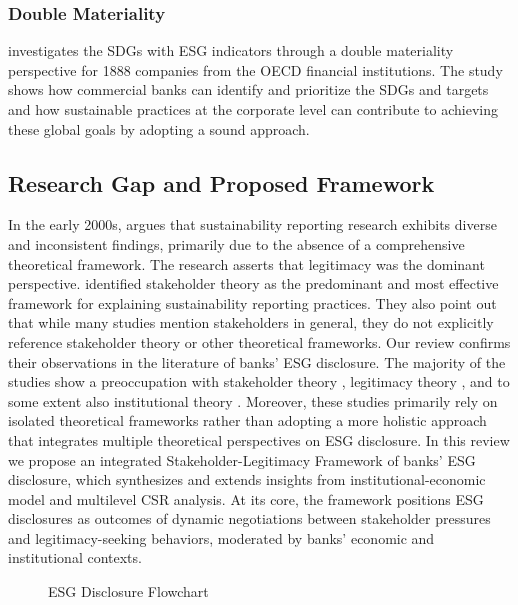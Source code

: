 \documentclass[
  authoryear]{elsarticle}
\makeatletter
\newcommand*\pandocbounded[1]{%
  \sbox\pandoc@box{#1}%
  \Gscale@div\@tempa{\textheight}{\dimexpr\ht\pandoc@box+\dp\pandoc@box\relax}%
  \Gscale@div\@tempb{\linewidth}{\wd\pandoc@box}%
  \ifdim\@tempb\p@<\@tempa\p@\let\@tempa\@tempb\fi%
  \ifdim\@tempa\p@<\p@\scalebox{\@tempa}{\usebox\pandoc@box}%
  \else\usebox{\pandoc@box}%
  \fi%
}
\makeatother
\begin{document}
\subsubsection{Double Materiality}\label{double-materiality}

\citet{ARAS2024} investigates the SDGs with ESG indicators through a
double materiality perspective for 1888 companies from the OECD
financial institutions. The study shows how commercial banks can
identify and prioritize the SDGs and targets and how sustainable
practices at the corporate level can contribute to achieving these
global goals by adopting a sound approach.

\subsection{Research Gap and Proposed
Framework}\label{research-gap-and-proposed-framework}

In the early 2000s, \citet{HOOGHIEMSTRA2000} argues that sustainability
reporting research exhibits diverse and inconsistent findings, primarily
due to the absence of a comprehensive theoretical framework. The
research asserts that legitimacy was the dominant perspective.
\citet{SPENCE2010} identified stakeholder theory as the predominant and
most effective framework for explaining sustainability reporting
practices. They also point out that while many studies mention
stakeholders in general, they do not explicitly reference stakeholder
theory or other theoretical frameworks. Our review confirms their
observations in the literature of banks' ESG disclosure. The majority of
the studies show a preoccupation with stakeholder theory
\citep{GALANT2017, SHEN2016, BUALLAY2021}, legitimacy theory
\citep[e.g.][]{CARNEVALE2014}, and to some extent also institutional
theory \citep{HIGGINS2014, BEBBINGTON2018, CHRISTENSEN2021}. Moreover,
these studies primarily rely on isolated theoretical frameworks rather
than adopting a more holistic approach that integrates multiple
theoretical perspectives on ESG disclosure. In this review we propose an
integrated Stakeholder-Legitimacy Framework of banks' ESG disclosure,
which synthesizes and extends insights from \citet{CAMPBELL2007}
institutional-economic model and \citet{AGUINIS2012} multilevel CSR
analysis. At its core, the framework positions ESG disclosures as
outcomes of dynamic negotiations between stakeholder pressures and
legitimacy-seeking behaviors, moderated by banks' economic and
institutional contexts.

\begin{figure}

\centering{

\pandocbounded{\texttt{[image: flowchart.pdf]}}

}

\caption{\label{fig-flowchart}ESG Disclosure Flowchart}

\end{figure}%
\end{document}
